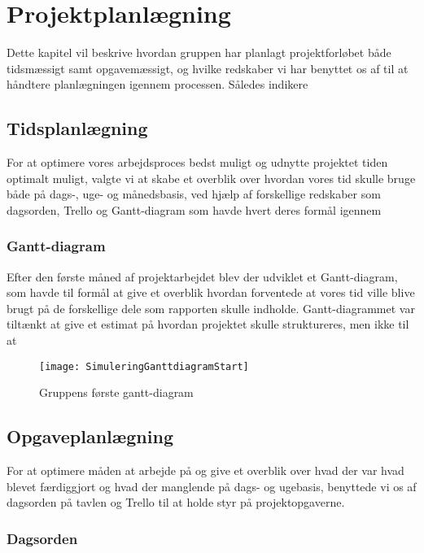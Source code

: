 \chapter{Projektplanlægning}\label{Projektplanlaegning}
Dette kapitel vil beskrive hvordan gruppen har planlagt projektforløbet både tidsmæssigt samt opgavemæssigt, og hvilke redskaber vi har benyttet os af til at håndtere planlægningen igennem processen. Således indikere 

\section{Tidsplanlægning}\label{Tidsplanlaegning}
For at optimere vores arbejdsproces bedst muligt og udnytte projektet tiden optimalt muligt, valgte vi at skabe et overblik over hvordan vores tid skulle bruge både på dags-, uge- og månedsbasis, ved hjælp af forskellige redskaber som dagsorden, Trello og Gantt-diagram som havde hvert deres formål igennem 



\subsection{Gantt-diagram}\label{Gantt-diagram}
Efter den første måned af projektarbejdet blev der udviklet et Gantt-diagram, som havde til formål at give et overblik hvordan forventede at vores tid ville blive brugt på de forskellige dele som rapporten skulle indholde. Gantt-diagrammet var tiltænkt at give et estimat på hvordan projektet skulle struktureres, men ikke til at 

\begin{figure}[h]
\texttt{[image: SimuleringGanttdiagramStart]}
\centering
\caption{Gruppens første gantt-diagram}\label{Gantt-diagram-picture}
\end{figure}

\section{Opgaveplanlægning}\label{Opgaveplanlaegning}

For at optimere måden at arbejde på og give et overblik over hvad der var hvad blevet færdiggjort og hvad der manglende på dags- og ugebasis, benyttede vi os af dagsorden på tavlen og Trello til at holde styr på projektopgaverne. 

\subsection{Dagsorden}\label{Dagsorden}

